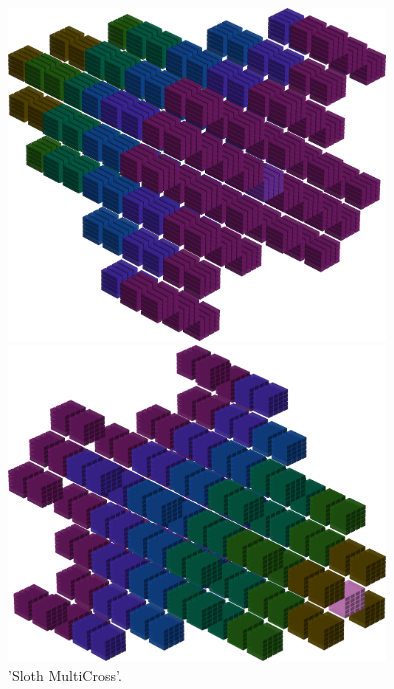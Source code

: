 \clearpage

%
\begin{minipage}[b]{0.48\linewidth}
\begin{figure}[H]
    \centering
    \begin{adjustbox}{width=5cm,margin=0cm 0cm}
      \includegraphics[width=10cm]{src/colorspace_patterns/pattern5-45.png}%
    \end{adjustbox}
    \begin{adjustbox}{width=5cm,margin=0cm 0cm}
      \includegraphics[width=10cm]{src/colorspace_patterns/pattern5-225.png}%
    \end{adjustbox}
\caption{'Sloth MultiCross'.}
\end{figure}
\end{minipage}
